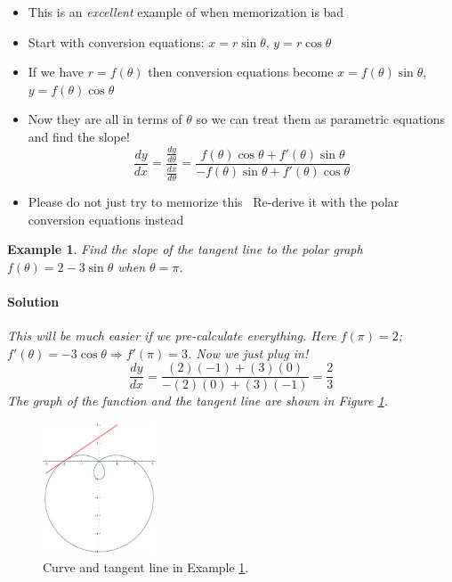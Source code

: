 \documentclass[letterpaper, 11pt, openany]{book}
\theoremstyle{mytheoremstyle}
\theoremstyle{myexamplestyle}
\newtheorem{example}{Example}[section]
\newenvironment{solution}{\paragraph{\sffamily \smaller \fontseries{b}\selectfont Solution}}{\hfill\faSquare}
\begin{document}
\begin{itemize}
    \item This is an \textit{excellent} example of when memorization is bad
    \item Start with conversion equations: $x = r \sin \theta$, $y = r \cos \theta$
    \item If we have $r = f(\theta)$ then conversion equations become $x = f(\theta) \sin \theta$, $y = f(\theta) \cos \theta$
    \item Now they are all in terms of $\theta$ so we can treat them as parametric equations and find the slope!
    \[\frac{dy}{dx} = \frac{\frac{dy}{d\theta}}{\frac{dx}{d\theta}} = \frac{f(\theta)\cos \theta + f'(\theta)\sin \theta}{-f(\theta) \sin \theta + f'(\theta)\cos \theta}\]
    \item[{\faExclamationCircle[solid]}] Please do not just try to memorize this \faFrown \ Re-derive it with the polar conversion equations instead \faSmile
\end{itemize}

\begin{example}\label{e:polarslope}
    Find the slope of the tangent line to the polar graph $f(\theta) = 2 - 3\sin \theta$ when $\theta = \pi$.
    \begin{solution}
        This will be much easier if we pre-calculate everything. Here $f(\pi) = 2$; $f'(\theta) = -3 \cos \theta \Rightarrow f'(\pi) = 3$. Now we just plug in!
        \[\frac{dy}{dx} = \frac{(2)(-1) + (3)(0)}{-(2)(0) + (3)(-1)} = \frac{2}{3}\]
        The graph of the function and the tangent line are shown in Figure \ref{f:polarslope}.
    \end{solution}
\end{example}

\begin{figure}[htbp]
    \centering
        \includegraphics[width = 0.3\textwidth]{Figures/polarslope.pdf}
    \caption{Curve and tangent line in Example \ref{e:polarslope}.}
    \label{f:polarslope}
\end{figure}
\end{document}
